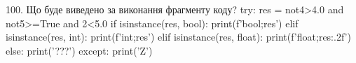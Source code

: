 \documentclass[11pt]{article}
\begin{document}
100. Що буде виведено за виконання фрагменту коду?
try:
    res = not4>4.0 and not5>=True and 2<5.0
    if isinstance(res, bool):
        print(f'bool;{res}')
    elif isinstance(res, int):
        print(f'int;{res}')
    elif isinstance(res, float):
        print(f'float;{res:.2f}')
    else:
        print('???')
except:
    print('Z')





































































































\newpage
\end{document}
